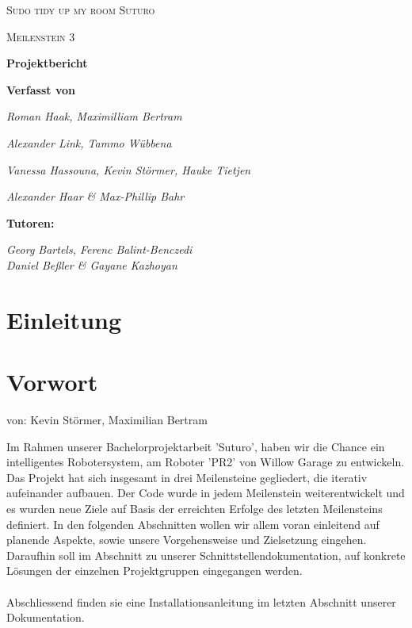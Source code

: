 \documentclass{suturo}
\makeatletter
\newcommand{\chapterauthor}[1]{%
  {\parindent0pt\vspace*{-27pt}%
  \linespread{0}\small\begin{flushright}von: #1\end{flushright}%
  \par\nobreak\vspace*{0pt}}
  \@afterheading%
}
\makeatother
\begin{document}
\begin{titlepage}
	\centering
	{\scshape\LARGE Sudo tidy up my room \glqq Suturo\grqq{} \par}
	\vspace{1.5cm}
	{\scshape\Large Meilenstein 3\par}
	\vspace{1.5cm}
	{\huge\bfseries Projektbericht \par}
	\vspace{2.5cm}
	{\normalsize\bfseries Verfasst von \par}
	{\small\itshape Roman Haak, Maximilliam Bertram\par}
	{\small\itshape Alexander Link, Tammo W\"ubbena\par}
	{\small\itshape Vanessa Hassouna, Kevin St\"ormer, Hauke Tietjen\par}	
	{\small\itshape Alexander Haar \&  Max-Phillip Bahr\par}	
	\vspace{2.5cm}
	{\normalsize\bfseries Tutoren: \par}
	{\small\itshape Georg Bartels, Ferenc Balint-Benczedi \\ Daniel Be{\ss}ler \& Gayane Kazhoyan\par}
	\vfill
\end{titlepage}

\tableofcontents

\newpage

\section*{Einleitung}
\section{Vorwort}
\chapterauthor{Kevin Störmer, Maximilian Bertram}
Im Rahmen unserer Bachelorprojektarbeit 'Suturo', haben wir die Chance ein intelligentes Robotersystem, am Roboter 'PR2' von Willow Garage zu entwickeln. Das Projekt hat sich insgesamt in drei Meilensteine gegliedert, die iterativ aufeinander aufbauen. Der Code wurde in jedem Meilenstein weiterentwickelt und es wurden neue Ziele auf Basis der erreichten Erfolge des letzten Meilensteins definiert.
In den folgenden Abschnitten wollen wir allem voran einleitend auf planende Aspekte, sowie unsere Vorgehensweise und Zielsetzung eingehen. Daraufhin soll im Abschnitt zu unserer Schnittstellendokumentation, auf konkrete Lösungen der einzelnen Projektgruppen eingegangen werden.\\ ~ \\
Abschliessend finden sie eine Installationsanleitung im letzten Abschnitt unserer Dokumentation.
\end{document}

